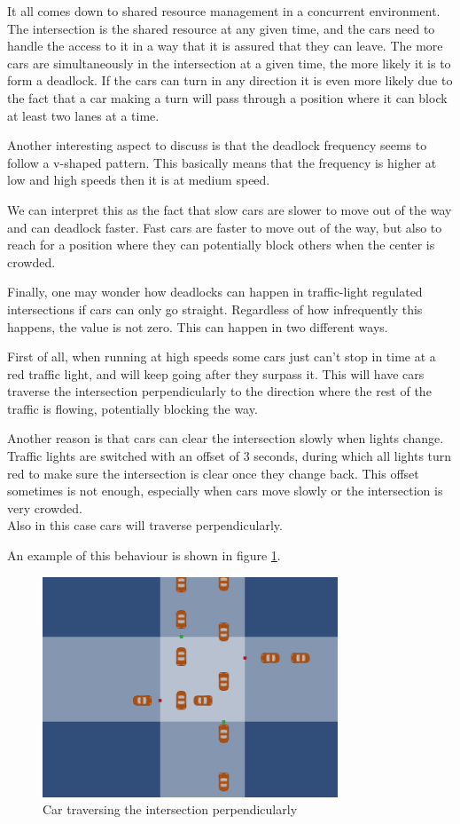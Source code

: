 It all comes down to shared resource management in a concurrent environment.
The intersection is the shared resource at any given time, and the cars need to handle the access to it in a way that it is assured that they can leave.
The more cars are simultaneously in the intersection at a given time, the more likely it is to form a deadlock.
If the cars can turn in any direction it is even more likely due to the fact that a car making a turn will pass through a position where it can block at least two lanes at a time.
\newline

Another interesting aspect to discuss is that the deadlock frequency seems to follow a v-shaped pattern.
This basically means that the frequency is higher at low and high speeds then it is at medium speed.

We can interpret this as the fact that slow cars are slower to move out of the way and can deadlock faster.
Fast cars are faster to move out of the way, but also to reach for a position where they can potentially block others when the center is crowded.
\newline

Finally, one may wonder how deadlocks can happen in traffic-light regulated intersections if cars can only go straight.
Regardless of how infrequently this happens, the value is not zero.
This can happen in two different ways.

First of all, when running at high speeds some cars just can't stop in time at a red traffic light, and will keep going after they surpass it.
This will have cars traverse the intersection perpendicularly to the direction where the rest of the traffic is flowing, potentially blocking the way.

Another reason is that cars can clear the intersection slowly when lights change.
Traffic lights are switched with an offset of 3 seconds, during which all lights turn red to make sure the intersection is clear once they change back. 
This offset sometimes is not enough, especially when cars move slowly or the intersection is very crowded.\\
Also in this case cars will traverse perpendicularly.

An example of this behaviour is shown in figure \ref{fig:dead-start}.

\begin{figure}
\centering
\includegraphics[scale=0.65]{img/deadlock-start-str}
\caption{Car traversing the intersection perpendicularly} 
\label{fig:dead-start}
\end{figure}



